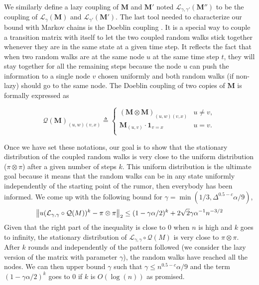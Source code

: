 \documentclass[10pt,journal,a4paper]{IEEEtran}
\begin{document}
We similarly define a lazy coupling of $\mathbf{M}$ and $\mathbf{M'}$ noted $\mathcal L_{\gamma, \gamma'}(\mathbf{M''})$ to be the coupling of $\mathcal L_\gamma(\mathbf{M})$ and $\mathcal L_{\gamma'}(\mathbf{M'})$. The last tool needed to characterize our bound with Markov chains is the Doeblin coupling \cite{coupling}. It is a special way to couple a transition matrix with itself to let the two coupled random walks stick together whenever they are in the same state at a given time step. It reflects the fact that when two random walks are at the same node $u$ at the same time step $t$, they will stay together for all the remaining steps because the node $u$ can push the information to a single node $v$ chosen uniformly and both random walks (if non-lazy) should go to the same node. The Doeblin coupling of two copies of $\mathbf{M}$ is formally expressed as

\[
  \mathcal Q(\mathbf{M})_{(u,w)(v,x)} \triangleq \left\{
    \begin{array}{ll}
      (\mathbf{M} \otimes \mathbf{M})_{(u,w)(v,x)} & u \not = v,\\
      \mathbf{M}_{(u,v)} \cdot \mathbf{1}_{v = x} & u = v.\\
    \end{array}
  \right.
\]

Once we have set these notations, our goal is to show that the stationary distribution of the coupled random walks is very close to the uniform distribution ($\pi \otimes \pi$) after a given number of steps $k$. This uniform distribution is the ultimate goal because it means that the random walks can be in any state uniformly independently of the starting point of the rumor, then everybody has been informed. We come up with the following bound for $\gamma = \min(1/3, \Delta^{0.5-c}\alpha/9)$,
\[
  \left\lVert u(\mathcal L_{\gamma,\gamma} \circ \mathcal Q(M))^k - \pi \otimes \pi\right\rVert_2 \leq (1 - \gamma \alpha / 2)^k + 2 \sqrt 2 \gamma \alpha^{-1} n^{-3/2}
\]
Given that the right part of the inequality is close to 0 when $n$ is high and $k$ goes to infinity, the stationary distribution of $\mathcal L_{\gamma,\gamma} \circ \mathcal Q(M)$ is very close to $\pi \otimes \pi$. After $k$ rounds and independently of the pattern followed (we consider the lazy version of the matrix with parameter $\gamma$), the random walks have reached all the nodes. We can then upper bound $\gamma$ such that $\gamma \leq n^{0.5-c}\alpha / 9$ and the term $(1-\gamma \alpha/2)^k$ goes to 0 if $k$ is $O(\log(n))$ as promised. 
\end{document}
